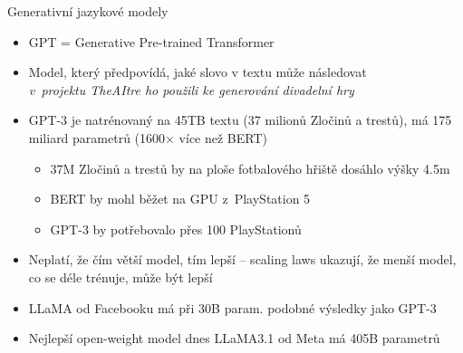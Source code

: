 \documentclass[aspectratio=169,dvipsnames]{beamer}
\begin{document}
\begin{frame}{Generativní jazykové modely}

    \begin{itemize}[<+->]

        \item GPT = Generative Pre-trained Transformer

        \item Model, který předpovídá, jaké slovo v textu může následovat \\
            \it v~projektu TheAItre ho použili ke generování divadelní hry

        \item GPT-3 je natrénovaný na 45TB textu (37 milionů Zločinů a trestů),
            má 175 miliard parametrů (1600$\times$ více než BERT)

            \begin{itemize}[<+->]

                \item 37M Zločinů a trestů by na ploše fotbalového hřiště
                    dosáhlo výšky 4.5m

                \item BERT by mohl běžet na GPU z~PlayStation 5

                \item GPT-3 by potřebovalo přes 100 PlayStationů

            \end{itemize}


		\item Neplatí, že čím větší model, tím lepší -- scaling laws ukazují,
				že menší model, co se déle trénuje, může být lepší

		\item LLaMA od Facebooku má při 30B param. podobné výsledky jako GPT-3

        \item Nejlepší open-weight model dnes LLaMA3.1 od Meta má 405B parametrů

    \end{itemize}

\end{frame}

\end{document}
